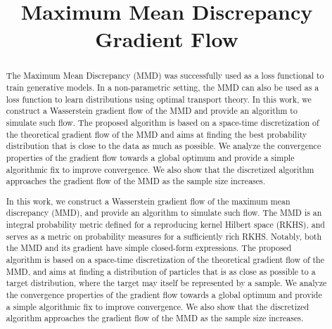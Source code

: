 \documentclass{article}
\title{Maximum Mean Discrepancy Gradient Flow}
\newcommand{\1}{\mathbbm 1}
\begin{document}
\maketitle


\iffalse

\begin{abstract}
The Maximum Mean Discrepancy (MMD) was successfully used as a loss functional to train generative models. In a non-parametric setting, the MMD can also be used as a loss function to learn distributions using optimal transport theory.
In this work, we construct a Wasserstein gradient flow of the MMD and provide an algorithm to simulate such flow. The proposed algorithm is based on a space-time discretization of the theoretical gradient flow of the MMD and aims at finding the best probability distribution that is close to the data as much as possible. We analyze the convergence properties of the gradient flow towards a global optimum and provide a simple algorithmic fix to improve convergence. We also show that the discretized algorithm approaches the gradient flow of the MMD as the sample size increases.
\end{abstract}


\begin{abstract}
  In this work, we construct a Wasserstein gradient flow of the maximum mean discrepancy (MMD), and provide an algorithm to simulate such flow.
The MMD is an integral probability metric defined for a reproducing kernel Hilbert space (RKHS), and serves as a metric on probability measures for a sufficiently rich RKHS. Notably, both the MMD and its gradient have simple closed-form expressions.
  The proposed algorithm is based on a space-time discretization of the theoretical gradient flow of the MMD, and aims at finding a  distribution of particles that is as  close as possible to a target distribution, where the target may itself be represented by a sample. We analyze the convergence properties of the gradient flow towards a global optimum and provide a simple algorithmic fix to improve convergence. We also show that the discretized algorithm approaches the gradient flow of the MMD as the sample size increases.
\end{abstract}
\end{document}
